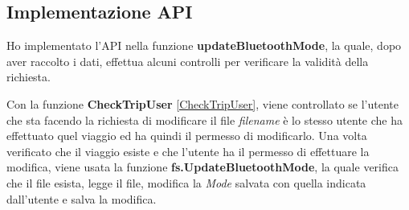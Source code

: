 \documentclass[main.tex]{subfiles}
\begin{document}
\subsection{Implementazione API}
Ho implementato l'API nella funzione \textbf{updateBluetoothMode}, la quale, dopo aver raccolto i dati, effettua alcuni controlli per verificare la validità della richiesta.\newline



Con la funzione \textbf{CheckTripUser} \ref{CheckTripUser}, viene controllato se l'utente che sta facendo la richiesta di modificare il file \emph{filename} è lo stesso utente che ha effettuato quel viaggio ed ha quindi il permesso di modificarlo.\newline
Una volta verificato che il viaggio esiste e che l'utente ha il permesso di effettuare la modifica, viene usata la funzione \textbf{fs.UpdateBluetoothMode}, la quale verifica che il file esista, legge il file, modifica la \emph{Mode} salvata con quella indicata dall'utente e salva la modifica.


\end{document}
